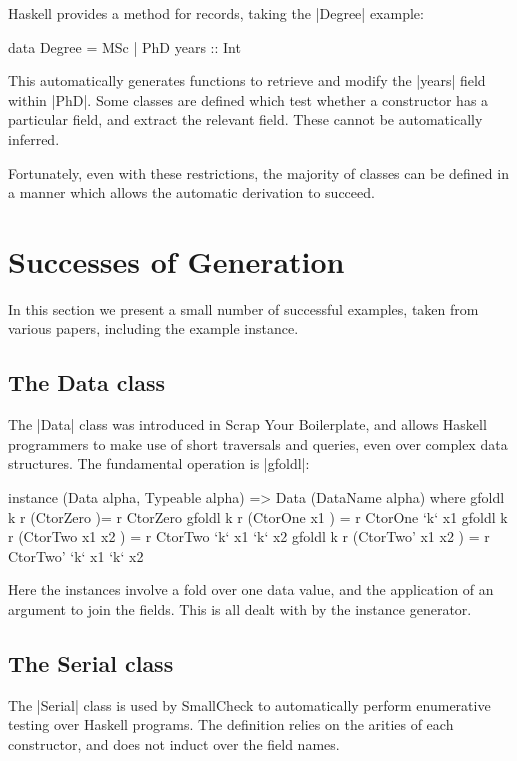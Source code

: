 \documentclass{llncs}
\begin{document}
Haskell provides a method for records, taking the |Degree| example:

\begin{code}
data Degree = MSc | PhD {years :: Int}
\end{code}

This automatically generates functions to retrieve and modify the |years| field within |PhD|. Some classes are defined which test whether a constructor has a particular field, and extract the relevant field. These cannot be automatically inferred.

Fortunately, even with these restrictions, the majority of classes can be defined in a manner which allows the automatic derivation to succeed.

\section{Successes of Generation}
\label{sec:automatic_success}

In this section we present a small number of successful examples, taken from various papers, including the example instance.


\subsection{The Data class}

The |Data| class was introduced in Scrap Your Boilerplate, and allows Haskell programmers to make use of short traversals and queries, even over complex data structures. The fundamental operation is |gfoldl|:

\begin{code}
instance (Data alpha, Typeable alpha) => Data (DataName alpha) where
    gfoldl k r (CtorZero         )= r CtorZero
    gfoldl k r (CtorOne   x1     ) = r CtorOne   `k` x1
    gfoldl k r (CtorTwo   x1 x2  ) = r CtorTwo   `k` x1 `k` x2
    gfoldl k r (CtorTwo'  x1 x2  ) = r CtorTwo'  `k` x1 `k` x2
\end{code}

Here the instances involve a fold over one data value, and the application of an argument to join the fields. This is all dealt with by the instance generator.

\subsection{The Serial class}

The |Serial| class is used by SmallCheck to automatically perform enumerative testing over Haskell programs. The definition relies on the arities of each constructor, and does not induct over the field names.
\end{document}
